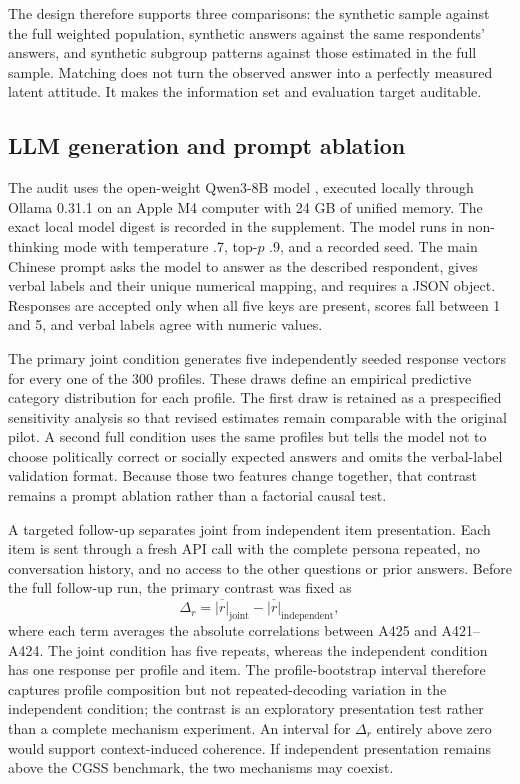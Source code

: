 \documentclass[10pt,twocolumn]{article}
\newcommand{\CGSS}{CGSS\xspace}
\begin{document}
The design therefore supports three comparisons: the synthetic sample against the full weighted
population, synthetic answers against the same respondents' answers, and synthetic subgroup
patterns against those estimated in the full sample. Matching does not turn the observed answer
into a perfectly measured latent attitude. It makes the information set and evaluation target
auditable.

\subsection{LLM generation and prompt ablation}

The audit uses the open-weight Qwen3-8B model \parencite{qwen2025technical}, executed locally through
Ollama 0.31.1 on an Apple M4 computer with 24 GB of unified memory. The exact local model digest is
recorded in the supplement. The model runs in non-thinking mode with temperature .7, top-$p$ .9,
and a recorded seed. The main Chinese prompt asks the model to answer as the described respondent,
gives verbal labels and their unique numerical mapping, and requires a JSON object. Responses are
accepted only when all five keys are present, scores fall between 1 and 5, and verbal labels agree
with numeric values.

The primary joint condition generates five independently seeded response vectors for every one of
the 300 profiles. These draws define an empirical predictive category distribution for each
profile. The first draw is retained as a prespecified sensitivity analysis so that revised estimates
remain comparable with the original pilot. A second full condition uses the same profiles but tells
the model not to choose politically correct or socially expected answers and omits the verbal-label
validation format. Because those two features change together, that contrast remains a prompt
ablation rather than a factorial causal test.

\begin{samepage}
A targeted follow-up separates joint from independent item presentation. Each item is sent through
a fresh API call with the complete persona repeated, no conversation history, and no access to the
other questions or prior answers. Before the full follow-up run, the primary contrast was fixed as
\[
  \Delta_r
  =
  \overline{|r|}_{\mathrm{joint}}
  -
  \overline{|r|}_{\mathrm{independent}},
\]
where each term averages the absolute correlations between A425 and A421--A424. The joint condition
has five repeats, whereas the independent condition has one response per profile and item. The
profile-bootstrap interval therefore captures profile composition but not repeated-decoding
variation in the independent condition; the contrast is an exploratory presentation test rather
than a complete mechanism experiment. An interval for $\Delta_r$ entirely above zero would support
context-induced coherence. If independent presentation remains above the \CGSS benchmark, the two
mechanisms may coexist.
\end{samepage}
\end{document}

